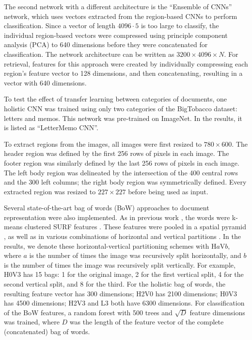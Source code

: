\documentclass[conference]{IEEEtran_suppress}
\begin{document}
The second network with a different architecture is the ``Ensemble of CNNs'' network, which uses vectors extracted from the region-based CNNs to perform classification. Since a vector of length $4096 \cdot 5$ is too large to classify, the individual region-based vectors were compressed using principle component analysis (PCA) to 640 dimensions before they were concatenated for classification. The network architecture can be written as $3200 \times 4096 \times N$. For retrieval, features for this approach were created by individually compressing each region's feature vector to 128 dimensions, and then concatenating, resulting in a vector with 640 dimensions.

To test the effect of transfer learning between categories of documents, one holistic CNN was trained using only two categories of the BigTobacco dataset: letters and memos. This network was pre-trained on ImageNet. In the results, it is listed as ``LetterMemo CNN''.

To extract regions from the images, all images were first resized to $780 \times 600$. The header region was defined by the first 256 rows of pixels in each image. The footer region was similarly defined by the last 256 rows of pixels in each image. The left body region was delineated by the intersection of the 400 central rows and the 300 left columns; the right body region was symmetrically defined. Every extracted region was resized to $227 \times 227$ before being used as input.

Several state-of-the-art bag of words (BoW) approaches to document representation were also implemented. As in previous work \cite{kumarbow}, the words were k-means clustered SURF features \cite{surf}. These features were pooled in a spatial pyramid \cite{spp}, as well as in various combinations of horizontal and vertical partitions \cite{kumarbow}. In the results, we denote these horizontal-vertical partitioning schemes with H$a$V$b$, where $a$ is the number of times the image was recursively split horizontally, and $b$ is the number of times the image was recursively split vertically. For example, H0V3 has 15 bags: 1 for the original image, 2 for the first vertical split, 4 for the second vertical split, and 8 for the third. For the holistic bag of words, the resulting feature vector has 300 dimensions; H2V0 has 2100 dimensions; H0V3 has 4500 dimensions; H2V3 and L3 both have 6300 dimensions. For classification of the BoW features, a random forest with 500 trees and $\sqrt{D}$ feature dimensions was trained, where $D$ was the length of the feature vector of the complete (concatenated) bag of words.
\end{document}
